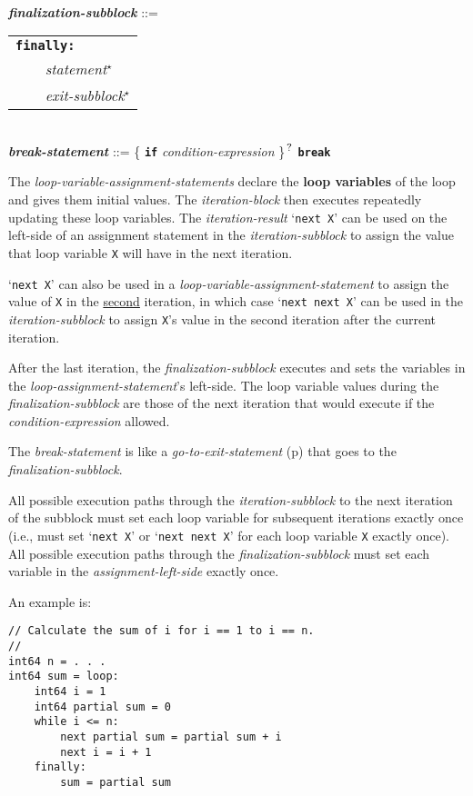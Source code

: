 \documentclass[12pt]{article}
\newcommand{\TT}[1]{{\tt \bfseries #1}}
\newcommand{\STAR}{{\Large $^\star$}}
\newcommand{\QMARK}{{$^{\,\mbox{\footnotesize ?}}$}}
\newcommand{\ttkey}[1]{{\tt \bfseries #1}}
\newcommand{\emkey}[1]{{\em \bfseries #1}}
\newcommand{\skey}[2]{{\rm \bfseries #1#2}}
\newcommand{\pagref}[1]{p\pageref{#1}}
\newenvironment{indpar}[1][0.3in]%
	{\begin{list}{}%
		     {\setlength{\itemsep}{0in}%
		      \setlength{\topsep}{0in}%
		      \setlength{\parsep}{1ex}%
		      \setlength{\labelwidth}{#1}%
		      \setlength{\leftmargin}{#1}%
		      \addtolength{\leftmargin}{\labelsep}}%
	 \item}%
	{\end{list}}
\begin{document}
\begin{indpar}
\\[0.5ex]
\emkey{finalization-subblock} ::= \\
\hspace*{0.5in}\begin{tabular}[t]{l}
        \ttkey{finally}\TT{:} \\
	\TT{~~~~}{\em statement}\STAR{} \\
	\TT{~~~~}{\em exit-subblock}\STAR{} \\
	\end{tabular}
\\[0.5ex]
\emkey{break-statement}\label{BREAK-STATEMENT} ::=
    \{ \TT{if} {\em condition-expression} \}\QMARK{} \ttkey{break}
\end{indpar}

The {\em loop-variable-assignment-statements} declare the \skey{loop variable}s
of the loop and gives them initial values.  The {\em iteration-block}
then executes repeatedly updating these loop variables.  The
{\em iteration-result} `{\tt next X}' can be used on the left-side of
an assignment statement in the {\em iteration-subblock}
to assign the value that loop variable
{\tt X} will have in the next iteration.

`{\tt next X}' can also be used in a {\em loop-variable-assignment-statement}
to assign the value of {\tt X} in the \underline{second} iteration,
in which case
`{\tt next next X}' can be used in the {\em iteration-subblock}
to assign {\tt X}'s value in the second iteration after the current
iteration.

After the last iteration, the {\em finalization-subblock}
executes and sets the variables in the {\em loop-assignment-statement}'s
left-side.  The loop variable values during the {\em finalization-subblock}
are those of the next iteration that would execute if the
{\em condition-expression} allowed.

The {\em break-statement} is like a
{\em go-to-exit-statement} (\pagref{GO-TO-STATEMENT}) that
goes to the {\em finalization-subblock}.

All possible execution paths through the {\em iteration-subblock}
to the next iteration of the subblock
must set each loop variable for subsequent iterations exactly once
(i.e., must set `{\tt next X}' or `{\tt next next X}' for each
loop variable {\tt X} exactly once).
All possible execution paths through the
{\em finalization-subblock} must set each variable
in the {\em assignment-left-side} exactly once.

An example is:
\begin{indpar}\begin{verbatim}
// Calculate the sum of i for i == 1 to i == n.
//
int64 n = . . .
int64 sum = loop:
    int64 i = 1
    int64 partial sum = 0
    while i <= n:
        next partial sum = partial sum + i
        next i = i + 1
    finally:
        sum = partial sum
\end{verbatim}\end{indpar}
\end{document}
